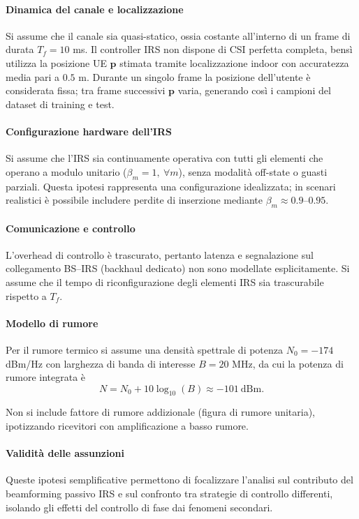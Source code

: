\documentclass[12pt,a4paper]{report}
\begin{document}
\paragraph{Dinamica del canale e localizzazione}
Si assume che il canale sia quasi-statico, ossia costante all'interno
di un frame di durata $T_f=10$ ms. Il controller IRS non dispone di
CSI perfetta completa, bensì utilizza la posizione UE $\mathbf{p}$
stimata tramite localizzazione indoor con accuratezza media pari a
$0.5$ m. Durante un singolo frame la posizione dell'utente è
considerata fissa; tra frame successivi $\mathbf{p}$ varia, generando
così i campioni del dataset di training e test.

\paragraph{Configurazione hardware dell'IRS}
Si assume che l'IRS sia continuamente operativa con tutti gli
elementi che operano a modulo unitario ($\beta_m=1,\ \forall m$),
senza modalità off-state o guasti parziali. Questa ipotesi
rappresenta una configurazione idealizzata; in scenari realistici è
possibile includere perdite di inserzione mediante $\beta_m \approx
0.9$--$0.95$.

\paragraph{Comunicazione e controllo}
L'overhead di controllo è trascurato, pertanto latenza e segnalazione
sul collegamento BS--IRS (backhaul dedicato) non sono modellate
esplicitamente. Si assume che il tempo di riconfigurazione degli
elementi IRS sia trascurabile rispetto a $T_f$.

\paragraph{Modello di rumore}
Per il rumore termico si assume una densità spettrale di potenza
$N_0=-174$ dBm/Hz con larghezza di banda di interesse $B=20$ MHz, da
cui la potenza di rumore integrata è
\begin{equation}
  N = N_0 + 10\log_{10}(B) \approx -101\ \text{dBm}.
\end{equation}

Non si include fattore di rumore addizionale (figura di rumore
unitaria), ipotizzando ricevitori con amplificazione a basso rumore.

\paragraph{Validità delle assunzioni}
Queste ipotesi semplificative permettono di focalizzare l'analisi sul
contributo del beamforming passivo IRS e sul confronto tra strategie
di controllo differenti, isolando gli effetti del controllo di fase
dai fenomeni secondari.
\end{document}
